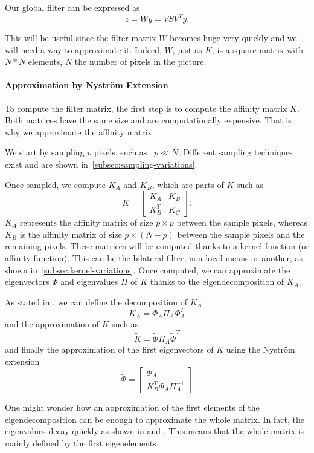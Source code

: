 Our global filter can be expressed as
\[z = Wy = VSV^Ty.\]

This will be useful since the filter matrix \(W\) becomes huge very quickly and we will need a way to approximate it.
Indeed, \(W\), just as \(K\), is a square matrix with \(N*N\) elements, \(N\) the number of pixels in the picture.

\paragraph{Approximation by Nystr\"om Extension}

To compute the filter matrix, the first step is to compute the affinity matrix \(K\).
Both matrices have the same size and are computationally expensive.
That is why we approximate the affinity matrix.

We start by sampling \(p\) pixels, such as  \(p \ll N\).
Different sampling techniques exist and are shown in~\ref{subsec:sampling-variations}.

Once sampled, we compute \(K_A\) and \(K_B\), which are parts of \(K\) such as
\[
 K = \begin{bmatrix}
  K_A & K_B \\
  K_B^T & K_C
 \end{bmatrix}.
\]
\(K_A\) represents the affinity matrix of size \(p \times p\) between the sample pixels, whereas \(K_B\) is the affinity matrix of size \(p \times (N-p)\) between the sample pixels and the remaining pixels.
These matrices will be computed thanks to a kernel function (or affinity function). This can be the bilateral filter, non-local means or another, as shown in~\ref{subsec:kernel-variations}.
Once computed, we can approximate the eigenvectors \(\Phi\) and eigenvalues \(\Pi\) of \(K\) thanks to the eigendecomposition of \(K_A\).

As stated in \cite{glide_2014}, we can define the decomposition of \(K_A\)
\[K_A = \Phi_A \Pi_A \Phi_A^T\]
and the approximation of \(K\) such as
\[\tilde{K} = \tilde{\Phi} \Pi_A \tilde{\Phi}^T\]
and finally the approximation of the first eigenvectors of \(K\) using the Nystr\"om extension \cite{fowlkes_spectral_2004}
\[
 \tilde{\Phi} = \begin{bmatrix}
  \Phi_A \\
  K_B^T \Phi_A \Pi_A^{-1}
 \end{bmatrix}
\]

One might wonder how an approximation of the first elements of the eigendecomposition can be enough to approximate the whole matrix.
In fact, the eigenvalues decay quickly as shown in \cite{siam_slides_2016} and \cite{meyer_perturbation_2014}.
This means that the whole matrix is mainly defined by the first eigenelements.

